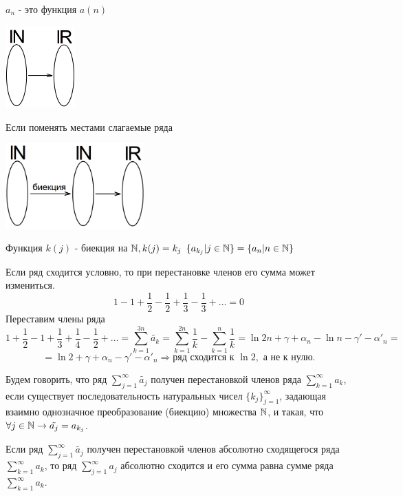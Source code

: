 	$a_n$ - это функция $a(n)$
	\begin{center}
		\includegraphics[width=0.2\textwidth]{img/lecture8/sequence}
	\end{center}
	Если поменять местами слагаемые ряда
	\begin{center}
		\includegraphics[width=0.4\textwidth]{img/lecture8/replacement_summands}
	\end{center}
	Функция $k(j)$ - биекция на $\mathbb N, k(j) = k_j$ $\{a_{k_j} | j \in \mathbb N\} = \{a_n | n \in \mathbb N\}$
	
	\begin{example}
		Если ряд сходится условно, то при перестановке членов его сумма может измениться.
		\[ 1 - 1 + \frac{1}{2} - \frac{1}{2} + \frac{1}{3} - \frac{1}{3} + \dots = 0 \]
		Переставим члены ряда
		\[ 1 + \frac{1}{2} - 1 + \frac{1}{3} + \frac{1}{4} - \frac{1}{2} + \dots = \sum_{k = 1}^{3n} \tilde{a_k} = \sum_{k = 1}^{2n} \frac{1}{k} - \sum_{k = 1}^n \frac{1}{k} = \ln{2n} + \gamma + \alpha_n - \ln{n} - \gamma' - \alpha'_n = \]
		\[ = \ln{2} + \gamma + \alpha_n - \gamma' - \alpha'_n \Rightarrow \text{ряд сходится к } \ln{2}, \text{ а не к нулю.} \]
	\end{example}
		
	\begin{definition}
		Будем говорить, что ряд $\sum_{j = 1}^{\infty} \tilde{a_j}$ получен перестановкой членов ряда $\sum_{k = 1}^{\infty} a_k$, если существует последовательность натуральных чисел $\{k_j\}^{\infty}_{j = 1}$, задающая взаимно однозначное преобразование (биекцию) множества $\mathbb N$, и такая, что $\forall j \in \mathbb N \rightarrow \tilde{a_j} = a_{k_j}$.
	\end{definition}
	
	\begin{theorem}
		Если ряд $\sum^{\infty}_{j = 1} \tilde{a_j}$ получен перестановкой членов абсолютно сходящегося ряда $\sum^{\infty}_{k = 1} a_k$, то ряд $\sum^{\infty}_{j = 1} a_j$ абсолютно сходится и его сумма равна сумме ряда $\sum^{\infty}_{k = 1} a_k$.
	\end{theorem}
	
